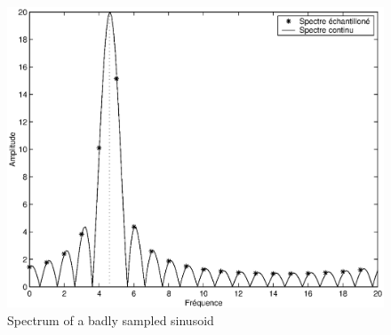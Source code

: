 \begin{figure}[ht]
    \begin{center}
    \includegraphics[scale=0.4]{images/spectre-signal-non-periodique.eps}
    \end{center}
    \caption{Spectrum of a badly sampled sinusoid}
              \label{fig-spectrum-non-periodic-signal}
\end{figure}

